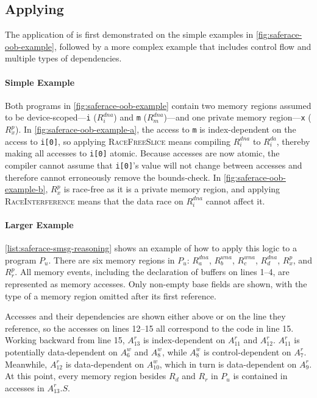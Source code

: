 \subsection{Applying \smsg}

The application of \smsg is first demonstrated on the simple examples in \myfig\ref{fig:saferace-oob-example}, followed by a more complex example that includes control flow and multiple types of dependencies.

\paragraph{Simple Example}
Both programs in \myfig\ref{fig:saferace-oob-example} contain two memory regions assumed to be device-scoped---\texttt{i} ($R^{dna}_i$) and \texttt{m} ($R^{dna}_m$)---and one private memory region---\texttt{x} ($R^p_x$). In \myfig\ref{fig:saferace-oob-example-a}, the access to \texttt{m} is index-dependent on the access to \texttt{i[0]}, so applying \textsc{RaceFreeSlice} means compiling $R^{dna}_i$ to $R^{da}_i$, thereby making all accesses to \texttt{i[0]} atomic. Because accesses are now atomic, the compiler cannot assume that \texttt{i[0]}'s value will not change between accesses and therefore cannot erroneously remove the bounds-check. In \myfig\ref{fig:saferace-oob-example-b}, $R^p_x$ is race-free as it is a private memory region, and applying \textsc{RaceInterference} means that the data race on $R^{dna}_i$ cannot affect it.

\paragraph{Larger Example}
\mylistinglong\ref{list:saferace-smsg-reasoning} shows an example of how to apply this logic to a program $P_u$. There are six memory regions in $P_u$: $R^{dna}_a$, $R^{wna}_b$, $R^{wna}_c$, $R^{dna}_d$, $R^p_x$, and $R^p_r$. All memory events, including the declaration of buffers on lines 1--4, are represented as memory accesses. Only non-empty base fields are shown, with the type of a memory region omitted after its first reference.

Accesses and their dependencies are shown either above or on the line they reference, so the accesses on lines 12--15 all correspond to the code in line 15. Working backward from line 15, $A^r_{13}$ is index-dependent on $A^r_{11}$ and $A^r_{12}$. $A^r_{11}$ is potentially data-dependent on $A^w_6$ and $A^w_8$, while $A^w_8$ is control-dependent on $A^r_7$. Meanwhile, $A^r_{12}$ is data-dependent on $A^w_{10}$, which in turn is data-dependent on $A^r_9$. At this point, every memory region besides $R_d$ and $R_r$ in $P_u$ is contained in accesses in $A^r_{13}.S$.

